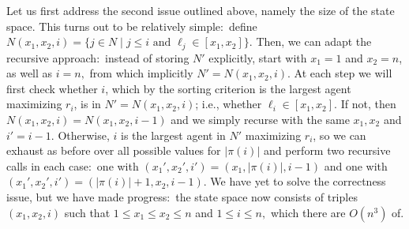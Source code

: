 \documentclass[a4paper]{article}
\newcommand{\set}[1]{\{#1\}}
\newcommand{\modulus}[1]{\vert #1 \vert}
\begin{document}
Let us first address the second issue outlined above, namely the size of the state space. This turns out to be relatively simple:~define $N(x_1, x_2, i) = \set{j \in N \mid j \leq i \text{ and } \ell_j \in [x_1, x_2]}.$ Then, we can adapt the recursive approach:~instead of storing $N'$ explicitly, start with $x_1 = 1$ and $x_2 = n$, as well as $i = n,$ from which implicitly $N' = N(x_1, x_2, i)$. At each step we will first check whether $i$, which by the sorting criterion is the largest agent maximizing $r_i$, is in $N' = N(x_1, x_2, i)$; i.e., whether $\ell_i \in [x_1, x_2].$ If not, then $N(x_1, x_2, i)=N(x_1,x_2,i-1)$ and we simply recurse with the same $x_1, x_2$ and $i' = i - 1.$ Otherwise, $i$ is the largest agent in $N'$ maximizing $r_i$, so we can exhaust as before over all possible values for $\modulus{\pi(i)}$ and perform two recursive calls in each case:~one with $(x_1', x_2', i') = (x_1, \modulus{\pi(i)}, i - 1)$ and one with $(x_1', x_2', i') = (\modulus{\pi(i)} + 1, x_2, i - 1)$. We have yet to solve the correctness issue, but we have made progress:~the state space now consists of triples $(x_1, x_2, i)$ such that $1 \leq x_1 \leq x_2 \leq n$ and $1 \leq i \leq n,$ which there are $O(n^3)$ of. 
\end{document}
